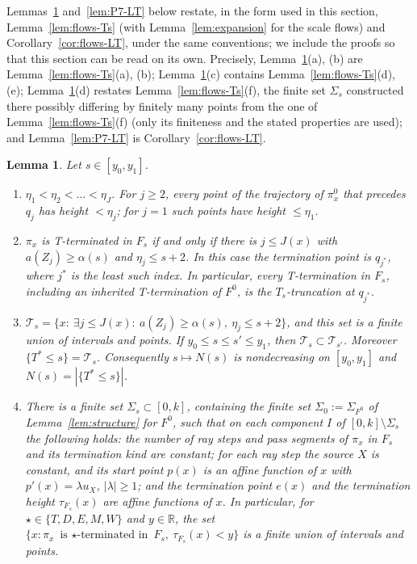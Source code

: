 \documentclass[11pt]{amsart}
\newcommand{\R}{\mathbb R}
\newcommand{\cT}{\mathcal T}
\newcommand{\Fz}{F^{0}}
\newcommand{\Fs}{F_{s}}
\newcommand{\Tstar}{T^{*}}
\newtheorem{lemma}[theorem]{Lemma}
\theoremstyle{definition}
\theoremstyle{remark}
\numberwithin{equation}{section}
\begin{document}
Lemmas~\ref{lem:P7-Tchar} and~\ref{lem:P7-LT} below restate, in the form used in this section, Lemma~\ref{lem:flows-Ts} (with Lemma~\ref{lem:expansion} for the scale flows) and Corollary~\ref{cor:flows-LT}, under the same conventions; we include the proofs so that this section can be read on its own. Precisely, Lemma~\ref{lem:P7-Tchar}(a), (b) are Lemma~\ref{lem:flows-Ts}(a), (b); Lemma~\ref{lem:P7-Tchar}(c) contains Lemma~\ref{lem:flows-Ts}(d), (e); Lemma~\ref{lem:P7-Tchar}(d) restates Lemma~\ref{lem:flows-Ts}(f), the finite set $\Sigma_s$ constructed there possibly differing by finitely many points from the one of Lemma~\ref{lem:flows-Ts}(f) (only its finiteness and the stated properties are used); and Lemma~\ref{lem:P7-LT} is Corollary~\ref{cor:flows-LT}.

\begin{lemma}\label{lem:P7-Tchar}
Let $s\in[y_0,y_1]$.
\begin{enumerate}[label=(\alph*)]
\item $\eta_1<\eta_2<\dots<\eta_J$. For $j\ge2$, every point of the trajectory of $\pi^0_x$ that precedes $q_j$ has height $<\eta_j$; for $j=1$ such points have height $\le\eta_1$.
\item $\pi_x$ is T-terminated in $\Fs$ if and only if there is $j\le J(x)$ with $a(Z_j)\ge\alpha(s)$ and $\eta_j\le s+2$. In this case the termination point is $q_{j^*}$, where $j^*$ is the least such index. In particular, every T-termination in $\Fs$, including an inherited T-termination of $\Fz$, is the $T_s$-truncation at $q_{j^*}$.
\item $\cT_s=\{x:\ \exists j\le J(x):\ a(Z_j)\ge\alpha(s),\ \eta_j\le s+2\}$, and this set is a finite union of intervals and points. If $y_0\le s\le s'\le y_1$, then $\cT_s\subset\cT_{s'}$. Moreover $\{\Tstar\le s\}=\cT_s$. Consequently $s\mapsto N(s)$ is nondecreasing on $[y_0,y_1]$ and $N(s)=|\{\Tstar\le s\}|$.
\item There is a finite set $\Sigma_s\subset[0,k]$, containing the finite set $\Sigma_0:=\Sigma_{\Fz}$ of Lemma~\ref{lem:structure} for $\Fz$, such that on each component $I$ of $[0,k]\setminus\Sigma_s$ the following holds: the number of ray steps and pass segments of $\pi_x$ in $\Fs$ and its termination kind are constant; for each ray step the source $X$ is constant, and its start point $p(x)$ is an affine function of $x$ with $p'(x)=\lambda u_X$, $|\lambda|\ge1$; and the termination point $e(x)$ and the termination height $\tau_{\Fs}(x)$ are affine functions of $x$. In particular, for $\star\in\{T,D,E,M,W\}$ and $y\in\R$, the set $\{x:\pi_x\text{ is $\star$-terminated in }\Fs,\ \tau_{\Fs}(x)<y\}$ is a finite union of intervals and points.
\end{enumerate}
\end{lemma}
\end{document}
